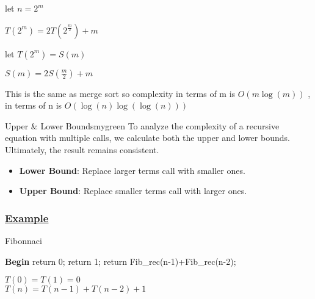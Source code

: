 let \(n = 2^m\)
\begin{center}
\(T(2^m) = 2T(2^{\frac{m}{2}}) + m\)\\[0.15cm]
\end{center}
let \(T(2^m) = S(m)\)

\begin{center}
\(S(m) = 2S(\frac{m}{2}) + m\)\\[0.15cm]
\end{center}

\vspace{0.5cm}
\begin{center}
This is the same as merge sort so complexity in terms of m is
\(O(m\log(m))\) , in terms of n is \(\boxed{O(\log(n)\log(\log(n)))}\)
\end{center}

\vspace{1cm}


\begin{prettyBox}{Upper \& Lower Bounds}{mygreen}
To analyze the complexity of a recursive equation with multiple calls, we calculate both the upper and lower bounds.  
Ultimately, the result remains consistent.  

\begin{itemize}
    \item \textbf{Lower Bound}: Replace larger terms call with smaller ones.
    \item \textbf{Upper Bound}: Replace smaller terms call with larger ones.  
\end{itemize}
\end{prettyBox}


\subsubsection*{\underline{Example}}

\begin{algorithm}
\caption{Fibonnaci}
\begin{algorithmic}[1]
\State  \textbf{\textcolor{redPlot}{Begin}}
\State return 0;
\State return 1;
\Else 
\State return Fib\_rec(n-1)+Fib\_rec(n-2);
\EndIf
\EndFunction
\end{algorithmic}
\end{algorithm}

\(T(0) = T(1) = 0\)\\
\(T(n) = T(n-1) + T(n-2) + 1\)\\

